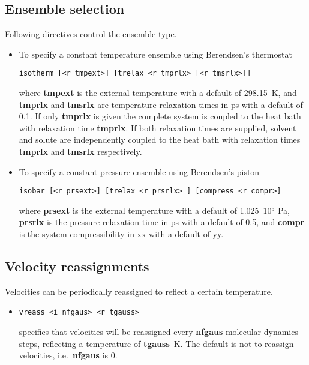 \subsection{Ensemble selection}
Following directives control the ensemble type.
\begin{itemize}
\item
To specify a constant temperature ensemble using Berendsen's thermostat
\begin{verbatim}
isotherm [<r tmpext>] [trelax <r tmprlx> [<r tmsrlx>]]
\end{verbatim}
where {\bf tmpext} is the external temperature with a default of 298.15~K,
and {\bf tmprlx} and {\bf tmsrlx} are temperature relaxation times in ps 
with a default of 0.1. If only {\bf tmprlx} is given the complete system
is coupled to the heat bath with relaxation time {\bf tmprlx}. If both
relaxation times are supplied, solvent and solute are independently coupled
to the heat bath with relaxation times {\bf tmprlx} and {\bf tmsrlx}
respectively.
\item
To specify a constant pressure ensemble using Berendsen's piston
\begin{verbatim}
isobar [<r prsext>] [trelax <r prsrlx> ] [compress <r compr>]
\end{verbatim}
where {\bf prsext} is the external temperature with a default of 1.025~10$^5$ Pa,
{\bf prsrlx} is the pressure relaxation time in ps with a default of 0.5, and
{\bf compr} is the system compressibility in xx with a default of yy.
\end{itemize}
\subsection{Velocity reassignments}
Velocities can be periodically reassigned to reflect a certain temperature.
\begin{itemize}
\item
\begin{verbatim}
vreass <i nfgaus> <r tgauss>
\end{verbatim}
specifies that velocities will be reassigned every {\bf nfgaus} molecular
dynamics steps, reflecting a temperature of {\bf tgauss}~K. The default
is not to reassign velocities, i.e.\ {\bf nfgaus} is 0.
\end{itemize}
